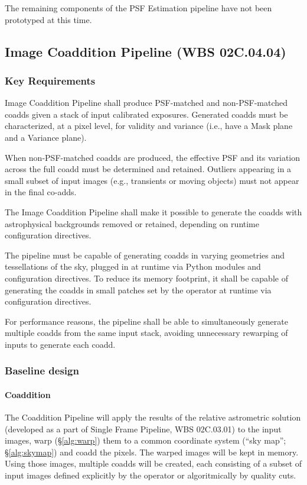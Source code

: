 \documentclass[12pt]{article}
\newcommand{\wbsSFM}{WBS 02C.03.01}
\newcommand{\wbsCoadd}{WBS 02C.04.04}
\begin{document}
The remaining components of the PSF Estimation pipeline have not been prototyped at this time.

\clearpage

\subsection{Image Coaddition Pipeline (\wbsCoadd)}

\subsubsection{Key Requirements}

Image Coaddition Pipeline shall produce PSF-matched and non-PSF-matched coadds given a stack of input calibrated exposures. Generated coadds must be characterized, at a pixel level, for validity and variance (i.e., have a Mask plane and a Variance plane).

When non-PSF-matched coadds are produced, the effective PSF and its variation across the full coadd must be determined and retained. Outliers appearing in a small subset of input images (e.g., transients or moving objects) must not appear in the final co-adds. %

The Image Coaddition Pipeline shall make it possible to generate the coadds with astrophysical backgrounds removed or retained, depending on runtime configuration directives.

The pipeline must be capable of generating coadds in varying geometries and tessellations of the sky, plugged in at runtime via Python modules and configuration directives. To reduce its memory footprint, it shall be capable of generating the coadds in small patches set by the operator at runtime via configuration directives.

For performance reasons, the pipeline shall be able to simultaneously generate multiple coadds from the same input stack, avoiding unnecessary rewarping of inputs to generate each coadd.

\subsubsection{Baseline design}

\paragraph{Coaddition} The Coaddition Pipeline will apply the results of the relative astrometric solution (developed as a part of Single Frame Pipeline, \wbsSFM) to the input images, warp (\S\ref{alg:warp}) them to a common coordinate system
(``sky map''; \S\ref{alg:skymap}) and coadd the pixels. The warped images will be kept in memory. Using those images, multiple coadds will be created, each consisting of a subset of input images defined explicitly by the operator or algoritmically by quality cuts.
\\
\end{document}
